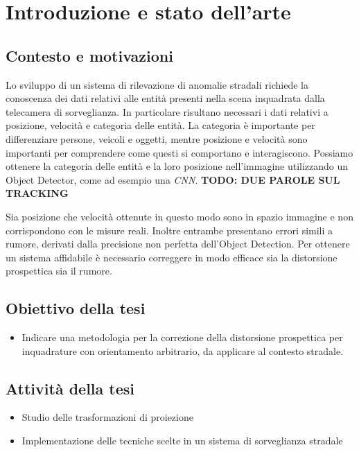 \chapter{Introduzione e stato dell'arte}
\label{sec:introduzione}


\section{Contesto e motivazioni}

Lo sviluppo di un sistema di rilevazione di anomalie stradali richiede la conoscenza dei dati relativi alle entità presenti nella scena inquadrata dalla telecamera di sorveglianza.
In particolare risultano necessari i dati relativi a posizione, velocità e categoria delle entità.
La categoria è importante per differenziare persone, veicoli e oggetti, mentre posizione e velocità sono importanti per comprendere come questi si comportano e interagiscono.
Possiamo ottenere la categoria delle entità e la loro posizione nell'immagine utilizzando un Object Detector, come ad esempio una \emph{CNN}.
\textbf{TODO: DUE PAROLE SUL TRACKING}

Sia posizione che velocità ottenute in questo modo sono in spazio immagine e non corrispondono con le misure reali.
Inoltre entrambe presentano errori simili a rumore, derivati dalla precisione non perfetta dell'Object Detection.
Per ottenere un sistema affidabile è necessario correggere in modo efficace sia la distorsione prospettica sia il rumore.

\section{Obiettivo della tesi}
\begin{itemize}
	\item Indicare una metodologia per la correzione della distorsione prospettica per inquadrature con orientamento arbitrario, da applicare al contesto stradale.
\end{itemize}

\section{Attività della tesi}

\begin{itemize}
	\item Studio delle trasformazioni di proiezione
	\item Implementazione delle tecniche scelte in un sistema di sorveglianza stradale
\end{itemize}

